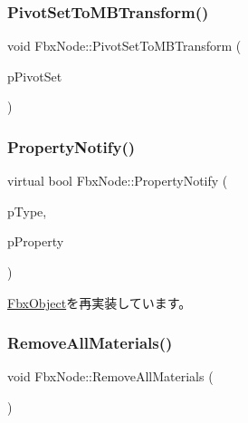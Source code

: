 \subsubsection{\texorpdfstring{Pivot\+Set\+To\+M\+B\+Transform()}{PivotSetToMBTransform()}}
{\footnotesize\ttfamily void Fbx\+Node\+::\+Pivot\+Set\+To\+M\+B\+Transform (\begin{DoxyParamCaption}\item[{\hyperlink{class_fbx_node_ae62b7311ac4727654cdf1ebd5cbf7343}{E\+Pivot\+Set}}]{p\+Pivot\+Set }\end{DoxyParamCaption})}

\mbox{\label{class_fbx_node_ac0edd8ef92070544e170bd0a38ed1efc}} 
\subsubsection{\texorpdfstring{Property\+Notify()}{PropertyNotify()}}
{\footnotesize\ttfamily virtual bool Fbx\+Node\+::\+Property\+Notify (\begin{DoxyParamCaption}\item[{\hyperlink{class_fbx_object_a528f1b2c2b7abbd64c525ba3a9a496b8}{E\+Property\+Notify\+Type}}]{p\+Type,  }\item[{\hyperlink{class_fbx_property}{Fbx\+Property} \&}]{p\+Property }\end{DoxyParamCaption})\hspace{0.3cm}{\ttfamily [virtual]}}



\hyperlink{class_fbx_object_a68b9ad65d98d7be9cb252949bc709385}{Fbx\+Object}を再実装しています。

\mbox{\label{class_fbx_node_ac3caa3dc577a5b6fe125ed547d2dbd9d}} 
\subsubsection{\texorpdfstring{Remove\+All\+Materials()}{RemoveAllMaterials()}}
{\footnotesize\ttfamily void Fbx\+Node\+::\+Remove\+All\+Materials (\begin{DoxyParamCaption}{ }\end{DoxyParamCaption})}

